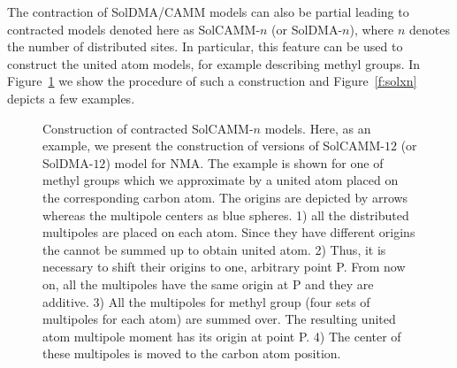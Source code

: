 \documentclass[a4paper,titlepage,twoside,fleqn,12pt]{book}
\begin{document}
\begin{refsection}
The contraction of SolDMA/CAMM models can also be partial
leading to contracted models denoted here as SolCAMM-$n$ (or SolDMA-$n$), where
$n$ denotes the number of distributed sites. In particular,
this feature can be used to construct the united atom models,
for example describing methyl groups. In Figure~\ref{f:contr}
we show the procedure of such a construction and Figure~\ref{f:solxn}
depicts a few examples.
%
\begin{figure}[ht]
\centering
\setlength\fboxsep{0.4pt}
\setlength\fboxrule{0.5pt}
\caption{Construction of contracted SolCAMM-$n$ models. Here, as an example, we present
the construction of versions of SolCAMM-$12$ (or SolDMA-$12$) model for NMA. 
The example is shown for one of methyl groups which we approximate by a united atom 
placed on the corresponding carbon atom. The origins are depicted by arrows
whereas the multipole centers as blue spheres. 1) all the distributed multipoles 
are placed on each atom. Since they have different origins the cannot be summed up 
to obtain united atom. 2) Thus, it is necessary to shift their origins to one, 
arbitrary point P. From now on, all the multipoles have the same origin at P 
and they are additive. 3) All the multipoles for methyl group (four sets 
of multipoles for each atom) are summed over. The resulting united atom 
multipole moment has its origin at point P. 4) The center of these multipoles 
is moved to the carbon atom position.
\label{f:contr}}
\end{figure}
%


\end{refsection}
\end{document}

